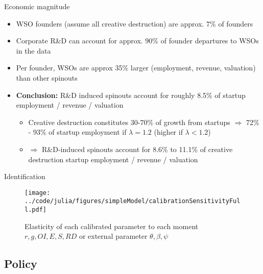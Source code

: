 \documentclass[english,usenames,dvipsnames]{beamer}
\begin{document}
\begin{frame}{Economic magnitude}\label{economic_magnitude}
	\hyperlink{calibration_overview}{}
	\begin{itemize}
		\item WSO founders (assume all creative destruction) are approx. $7\%$ of founders  \hyperlink{results_of_match}{}
		\item Corporate R\&D can account for approx. $90\%$ of founder departures to WSOs in the data \hyperlink{regs_economic_significance}{}
		\item Per founder, WSOs are approx 35\% larger (employment, revenue, valuation) than other spinouts \hyperlink{regs_startup_lifecycle_employment}{} \hyperlink{regs_startup_lifecycle_revenue}{} \hyperlink{regs_startup_lifecycle_valuation}{}  \hyperlink{regs_startup_lifecycle_goingoutofbusiness}{} \hyperlink{regs_startup_lifecycle_successfullyexiting}{} 
		\item \alert{\textbf{Conclusion:}} R\&D induced spinouts account for roughly 8.5\% of startup employment / revenue / valuation 
		\begin{itemize}
			\item Creative destruction constitutes 30-70\% of growth from startups $\Rightarrow$ 72\% - 93\% of startup employment if $\lambda = 1.2$ (higher if $\lambda < 1.2$)
			\item $\Rightarrow$ R\&D-induced spinouts account for 8.6\% to 11.1\% of creative destruction startup employment / revenue / valuation
		\end{itemize}
	\end{itemize}
\end{frame}

\begin{frame}{Identification}\label{identification}\hyperlink{parameters}{} 
	\begin{figure}
		\texttt{[image: ../code/julia/figures/simpleModel/calibrationSensitivityFull.pdf]}
		\caption{\small Elasticity of each calibrated parameter to each moment $r,g,OI,E,S,RD$ or external parameter $\theta, \beta, \psi$}
	\end{figure}
\end{frame}


\subsection{Policy}
\end{document}
